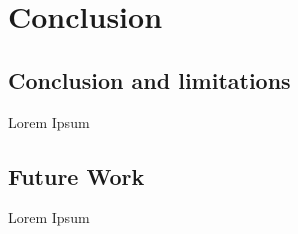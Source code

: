 \chapter{Conclusion}

\section{Conclusion and limitations} 

Lorem Ipsum

\section{Future Work} 

Lorem Ipsum